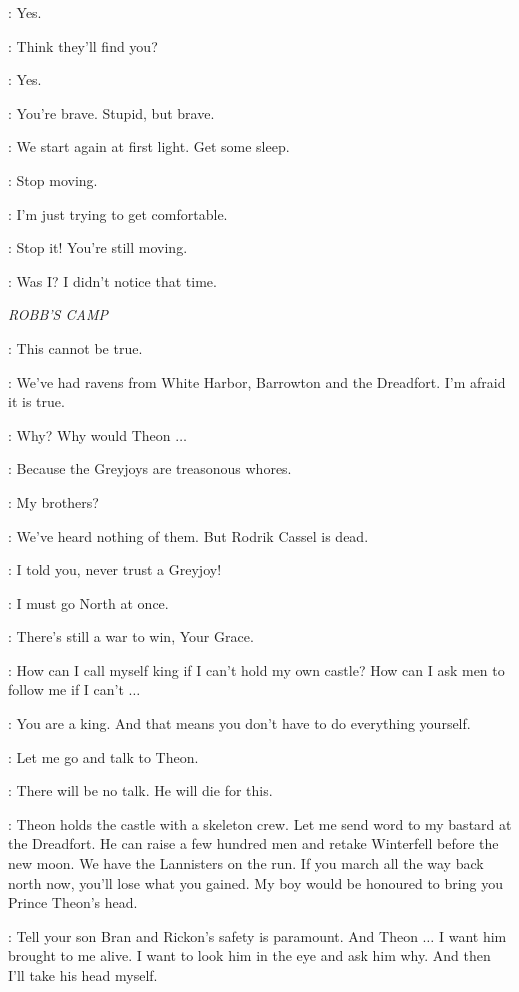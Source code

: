 \JON: Yes. 

\YGRITTE: Think they'll find you? 

\JON: Yes. 

\YGRITTE: You're brave. Stupid, but brave. 

\JON: We start again at first light. Get some sleep.


\JON: Stop moving. 

\YGRITTE: I'm just trying to get comfortable. 

\JON: Stop it! You're still moving. 

\YGRITTE: Was I? I didn't notice that time. 


\scene

\textit{ROBB'S CAMP} 


\ROBB: This cannot be true. 

\ROOSE: We've had ravens from White Harbor, Barrowton and the Dreadfort. I'm afraid it is true. 

\ROBB: Why? Why would Theon $\ldots$  

\ROOSE: Because the Greyjoys are treasonous whores. 

\ROBB: My brothers? 

\ROOSE: We've heard nothing of them. But Rodrik Cassel is dead. 

\CATELYN: I told you, never trust a Greyjoy! 

\ROBB: I must go North at once. 

\ROOSE: There's still a war to win, Your Grace. 

\ROBB: How can I call myself king if I can't hold my own castle? How can I ask men to follow me if I can't $\ldots$  

\ROOSE: You are a king. And that means you don't have to do everything yourself. 

\CATELYN: Let me go and talk to Theon. 

\ROBB: There will be no talk. He will die for this. 

\ROOSE: Theon holds the castle with a skeleton crew. Let me send word to my bastard at the Dreadfort. He can raise a few hundred men and retake Winterfell before the new moon. We have the Lannisters on the run. If you march all the way back north now, you'll lose what you gained. My boy would be honoured to bring you Prince Theon's head. 

\ROBB: Tell your son Bran and Rickon's safety is paramount. And Theon $\ldots$ I want him brought to me alive. I want to look him in the eye and ask him why. And then I'll take his head myself. 


